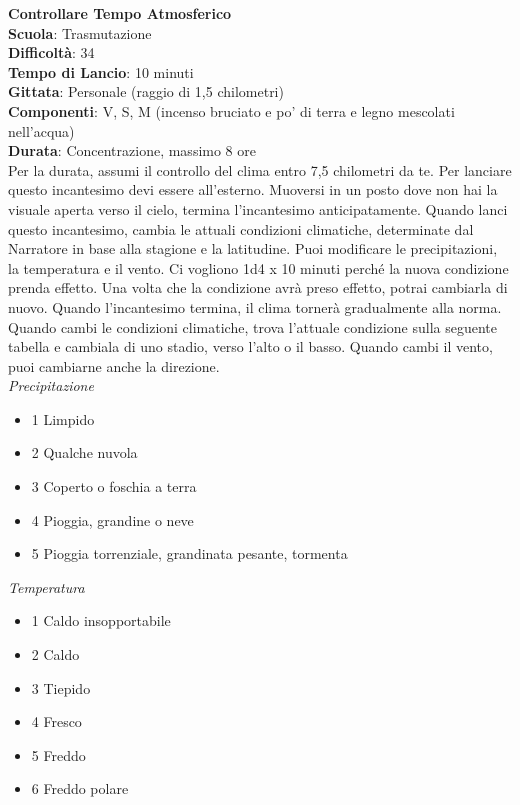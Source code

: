 \begin{multicols}{2}
\medskip\textbf{Controllare Tempo Atmosferico}\\
\textbf{Scuola}: Trasmutazione\\
\textbf{Difficoltà}: 34\\
\textbf{Tempo di Lancio}: 10 minuti\\
\textbf{Gittata}: Personale (raggio di 1,5 chilometri)\\
\textbf{Componenti}: V, S, M (incenso bruciato e po' di terra e legno mescolati nell'acqua)\\
\textbf{Durata}: Concentrazione, massimo 8 ore \\
Per la durata, assumi il controllo del clima entro 7,5 chilometri da te. Per lanciare questo incantesimo devi essere all'esterno. Muoversi in un posto dove non hai la visuale aperta verso il cielo, termina l'incantesimo anticipatamente. Quando lanci questo incantesimo, cambia le attuali condizioni climatiche, determinate dal Narratore in base alla stagione e la latitudine. Puoi modificare le precipitazioni, la temperatura e il vento. Ci vogliono 1d4 x 10 minuti perché la nuova condizione prenda effetto. Una volta che la condizione avrà preso effetto, potrai cambiarla di nuovo. Quando l'incantesimo termina, il clima tornerà gradualmente alla norma.\\
Quando cambi le condizioni climatiche, trova l'attuale condizione sulla seguente tabella e cambiala di uno stadio, verso l'alto o il basso. Quando cambi il vento, puoi cambiarne anche la direzione. \\
\medskip
\textit{Precipitazione}
\begin{itemize}
	\item 
1 Limpido
	\item 
2 Qualche nuvola
	\item 
3 Coperto o foschia a terra
	\item 
4 Pioggia, grandine o neve
	\item 
5 Pioggia torrenziale, grandinata pesante, tormenta
\end{itemize}

\textit{Temperatura}

\begin{itemize}
 \item 
1 Caldo insopportabile
	\item 
2 Caldo
	\item 
3 Tiepido
	\item 
4 Fresco
	\item 
5 Freddo
	\item 
6 Freddo polare
\end{itemize}


\end{multicols}
